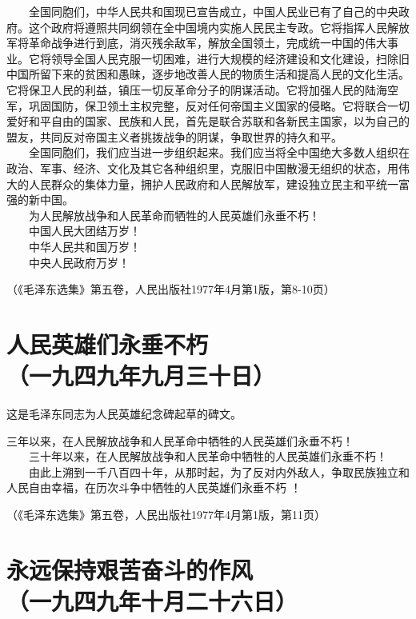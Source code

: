 \documentclass[cn,11pt,chinese]{elegantbook}
\def\myformat#1{\hfil\hfil #1}
\begin{document}
　　全国同胞们，中华人民共和国现已宣告成立，中国人民业已有了自己的中央政府。这个政府将遵照共同纲领在全中国境内实施人民民主专政。它将指挥人民解放军将革命战争进行到底，消灭残余敌军，解放全国领土，完成统一中国的伟大事业。它将领导全国人民克服一切困难，进行大规模的经济建设和文化建设，扫除旧中国所留下来的贫困和愚昧，逐步地改善人民的物质生活和提高人民的文化生活。它将保卫人民的利益，镇压一切反革命分子的阴谋活动。它将加强人民的陆海空军，巩固国防，保卫领土主权完整，反对任何帝国主义国家的侵略。它将联合一切爱好和平自由的国家、民族和人民，首先是联合苏联和各新民主国家，以为自己的盟友，共同反对帝国主义者挑拨战争的阴谋，争取世界的持久和平。\\
　　全国同胞们，我们应当进一步组织起来。我们应当将全中国绝大多数人组织在政治、军事、经济、文化及其它各种组织里，克服旧中国散漫无组织的状态，用伟大的人民群众的集体力量，拥护人民政府和人民解放军，建设独立民主和平统一富强的新中国。\\
　　为人民解放战争和人民革命而牺牲的人民英雄们永垂不朽！\\
　　中国人民大团结万岁！\\
　　中华人民共和国万岁！\\
　　中央人民政府万岁！\\
\begin{flushright}（《毛泽东选集》第五卷，人民出版社1977年4月第1版，第8-10页）\end{flushright}
\newpage\section*{\myformat{人民英雄们永垂不朽}\\\myformat{（一九四九年九月三十日）}}
\begin{introduction}\item  这是毛泽东同志为人民英雄纪念碑起草的碑文。\end{introduction}
三年以来，在人民解放战争和人民革命中牺牲的人民英雄们永垂不朽！\\
　　三十年以来，在人民解放战争和人民革命中牺牲的人民英雄们永垂不朽！\\
　　由此上溯到一千八百四十年，从那时起，为了反对内外敌人，争取民族独立和人民自由幸福，在历次斗争中牺牲的人民英雄们永垂不朽 ！\\
\begin{flushright}（《毛泽东选集》第五卷，人民出版社1977年4月第1版，第11页）\end{flushright}
\newpage\section*{\myformat{永远保持艰苦奋斗的作风}\\\myformat{（一九四九年十月二十六日）}}
\end{document}
